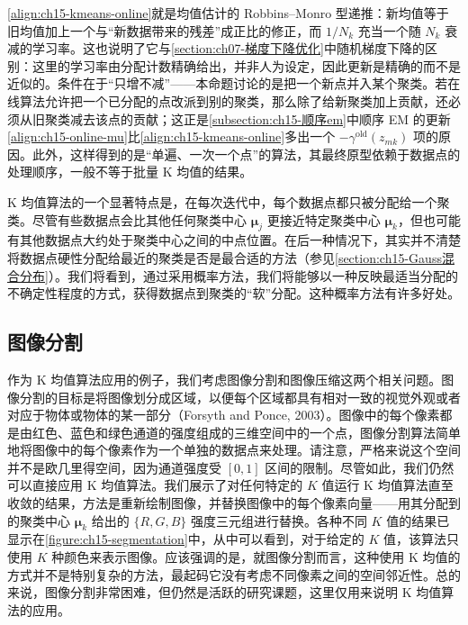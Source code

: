 \documentclass[../../main.tex]{subfiles}
\begin{document}
\begin{remark}
\eqref{align:ch15-kmeans-online}就是均值估计的 Robbins--Monro 型递推：新均值等于旧均值加上一个与“新数据带来的残差”成正比的修正，而 $1/N_k$ 充当一个随 $N_k$ 衰减的学习率。这也说明了它与\cref{section:ch07-梯度下降优化}中随机梯度下降的区别：这里的学习率由分配计数精确给出，并非人为设定，因此更新是精确的而不是近似的。条件在于“只增不减”——本命题讨论的是把一个新点并入某个聚类。若在线算法允许把一个已分配的点改派到别的聚类，那么除了给新聚类加上贡献，还必须从旧聚类减去该点的贡献；这正是\cref{subsection:ch15-顺序em}中顺序 EM 的更新\eqref{align:ch15-online-mu}比\eqref{align:ch15-kmeans-online}多出一个 $-\gamma^{\text{old}}(z_{mk})$ 项的原因。此外，这样得到的是“单遍、一次一个点”的算法，其最终原型依赖于数据点的处理顺序，一般不等于批量 K 均值的结果。
\end{remark}

K 均值算法的一个显著特点是，在每次迭代中，每个数据点都只被分配给一个聚类。尽管有些数据点会比其他任何聚类中心 $\bm{\mu}_j$ 更接近特定聚类中心 $\bm{\mu}_k$，但也可能有其他数据点大约处于聚类中心之间的中点位置。在后一种情况下，其实并不清楚将数据点硬性分配给最近的聚类是否是最合适的方法（参见\cref{section:ch15-Gauss混合分布}）。我们将看到，通过采用概率方法，我们将能够以一种反映最适当分配的不确定性程度的方式，获得数据点到聚类的“软”分配。这种概率方法有许多好处。

\subsection*{图像分割}

作为 K 均值算法应用的例子，我们考虑图像分割和图像压缩这两个相关问题。图像分割的目标是将图像划分成区域，以便每个区域都具有相对一致的视觉外观或者对应于物体或物体的某一部分（Forsyth and Ponce, 2003）。图像中的每个像素都是由红色、蓝色和绿色通道的强度组成的三维空间中的一个点，图像分割算法简单地将图像中的每个像素作为一个单独的数据点来处理。请注意，严格来说这个空间并不是欧几里得空间，因为通道强度受 $[0,1]$ 区间的限制。尽管如此，我们仍然可以直接应用 K 均值算法。我们展示了对任何特定的 $K$ 值运行 K 均值算法直至收敛的结果，方法是重新绘制图像，并替换图像中的每个像素向量——用其分配到的聚类中心 $\bm{\mu}_k$ 给出的 $\{R,G,B\}$ 强度三元组进行替换。各种不同 $K$ 值的结果已显示在\cref{figure:ch15-segmentation}中，从中可以看到，对于给定的 $K$ 值，该算法只使用 $K$ 种颜色来表示图像。应该强调的是，就图像分割而言，这种使用 K 均值的方式并不是特别复杂的方法，最起码它没有考虑不同像素之间的空间邻近性。总的来说，图像分割非常困难，但仍然是活跃的研究课题，这里仅用来说明 K 均值算法的应用。
\end{document}
